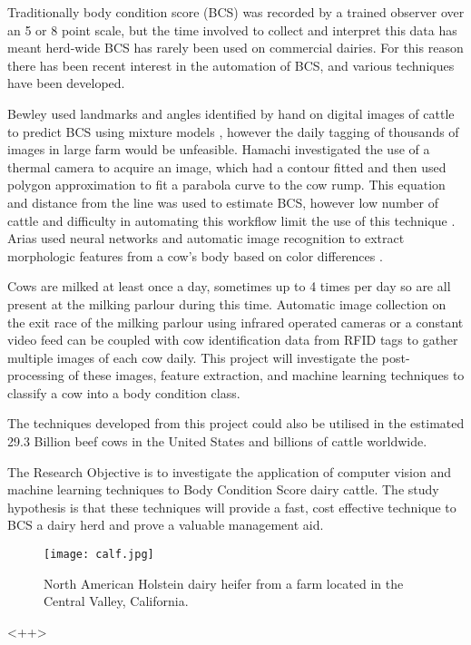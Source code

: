 \documentclass[11pt]{article}
\begin{document}
		Traditionally body condition score (BCS) was recorded by a trained observer over an 5 or 8 point scale\cite{Bewley2010}, but the time involved to collect and interpret this data has meant herd-wide BCS has rarely been used on commercial dairies.
		For this reason there has been recent interest in the automation of BCS, and various techniques have been developed.


		Bewley used landmarks and angles identified by hand on digital images of cattle to predict BCS using mixture models \cite{Bewley2008}, however the daily tagging of thousands of images in large farm would be unfeasible.
		Hamachi investigated the use of a thermal camera to acquire an image, which had a contour fitted and then used polygon approximation to fit a parabola curve to the cow rump. This equation and distance from the line was used to estimate BCS, however low number of cattle and difficulty in automating this workflow limit the use of this technique \cite{Halachmi2008}. 
		Arias used neural networks and automatic image recognition to extract morphologic features from a cow's body based on color differences \cite{Arias2004}. 

		
		Cows are milked at least once a day, sometimes up to 4 times per day so are all present at the milking parlour during this time.
		Automatic image collection on the exit race of the milking parlour using infrared operated cameras or a constant video feed can be coupled with cow identification data from RFID tags to gather multiple images of each cow daily.  
		This project will investigate the post-processing of these images, feature extraction, and machine learning techniques to classify a cow into a body condition class.  


		The techniques developed from this project could also be utilised in the estimated 29.3 Billion beef cows in the United States\cite{USDA2013} and billions of cattle worldwide.

		The Research Objective is to investigate the application of computer vision and machine learning techniques to Body Condition Score dairy cattle.
		The study hypothesis is that these techniques will provide a fast, cost effective technique to BCS a dairy herd and prove a valuable management aid.

		\begin{figure}[h!]
			\centering
			\texttt{[image: calf.jpg]}
			\caption{North American Holstein dairy heifer from a farm located in the Central Valley, California.}
			\label{fig:<+label+>}
		\end{figure}<++>
\newpage
\end{document}
